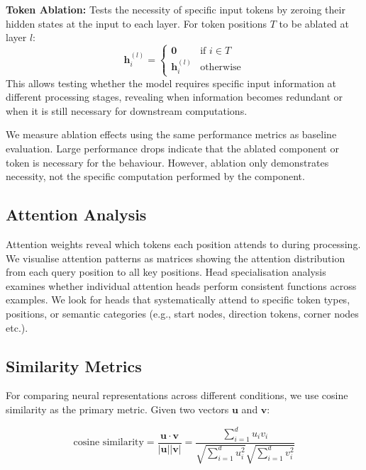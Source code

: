 \textbf{Token Ablation:} Tests the necessity of specific input tokens by zeroing their hidden states at the input to each layer. For token positions $T$ to be ablated at layer $l$:
\begin{equation}
\mathbf{h}_i^{(l)} = \begin{cases}
\mathbf{0} & \text{if } i \in T \\
\mathbf{h}_i^{(l)} & \text{otherwise}
\end{cases}
\end{equation}
This allows testing whether the model requires specific input information at different processing stages, revealing when information becomes redundant or when it is still necessary for downstream computations.

We measure ablation effects using the same performance metrics as baseline evaluation. Large performance drops indicate that the ablated component or token is necessary for the behaviour. However, ablation only demonstrates necessity, not the specific computation performed by the component.

\subsection{Attention Analysis}

Attention weights reveal which tokens each position attends to during processing. We visualise attention patterns as matrices showing the attention distribution from each query position to all key positions. Head specialisation analysis examines whether individual attention heads perform consistent functions across examples. We look for heads that systematically attend to specific token types, positions, or semantic categories (e.g., start nodes, direction tokens, corner nodes etc.).

\subsection{Similarity Metrics}

For comparing neural representations across different conditions, we use cosine similarity as the primary metric. Given two vectors $\mathbf{u}$ and $\mathbf{v}$:

\begin{equation}
\text{cosine similarity} = \frac{\mathbf{u} \cdot \mathbf{v}}{|\mathbf{u}||\mathbf{v}|} = \frac{\sum_{i=1}^{d} u_i v_i}{\sqrt{\sum_{i=1}^{d} u_i^2} \sqrt{\sum_{i=1}^{d} v_i^2}}
\end{equation}

